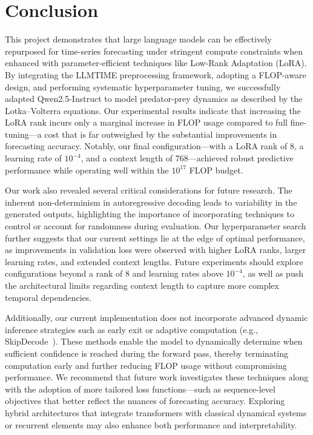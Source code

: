 \documentclass[a4paper,12pt]{article}
\begin{document}
  \section{Conclusion}

  This project demonstrates that large language models can be effectively repurposed for time-series forecasting under stringent compute constraints when enhanced with parameter-efficient techniques like Low-Rank Adaptation (LoRA). By integrating the LLMTIME preprocessing framework, adopting a FLOP-aware design, and performing systematic hyperparameter tuning, we successfully adapted Qwen2.5-Instruct to model predator-prey dynamics as described by the Lotka–Volterra equations. Our experimental results indicate that increasing the LoRA rank incurs only a marginal increase in FLOP usage compared to full fine-tuning—a cost that is far outweighed by the substantial improvements in forecasting accuracy. Notably, our final configuration—with a LoRA rank of 8, a learning rate of $10^{-4}$, and a context length of 768—achieved robust predictive performance while operating well within the $10^{17}$ FLOP budget.
  
  Our work also revealed several critical considerations for future research. The inherent non-determinism in autoregressive decoding leads to variability in the generated outputs, highlighting the importance of incorporating techniques to control or account for randomness during evaluation. Our hyperparameter search further suggests that our current settings lie at the edge of optimal performance, as improvements in validation loss were observed with higher LoRA ranks, larger learning rates, and extended context lengths. Future experiments should explore configurations beyond a rank of 8 and learning rates above $10^{-4}$, as well as push the architectural limits regarding context length to capture more complex temporal dependencies.
  
  Additionally, our current implementation does not incorporate advanced dynamic inference strategies such as early exit or adaptive computation (e.g., SkipDecode~\cite{delcorro2023skipdecode}). These methods enable the model to dynamically determine when sufficient confidence is reached during the forward pass, thereby terminating computation early and further reducing FLOP usage without compromising performance. We recommend that future work investigates these techniques along with the adoption of more tailored loss functions—such as sequence-level objectives that better reflect the nuances of forecasting accuracy. Exploring hybrid architectures that integrate transformers with classical dynamical systems or recurrent elements may also enhance both performance and interpretability.
  
\end{document}
